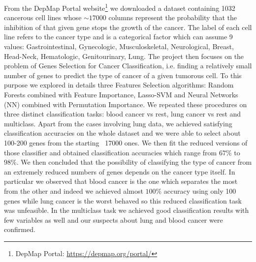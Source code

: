 \documentclass[a4paper,11pt, oneside]{article}  %
\begin{document}
From the DepMap Portal website\footnote{DepMap Portal: \url{https://depmap.org/portal/}} we downloaded a dataset containing 1032 cancerous cell lines whose $\sim 17000$ columns represent the probability that the inhibition of that given gene stops the growth of the cancer.  The label of each cell line refers to the cancer type and is a categorical factor which can assume 9 values: Gastrointestinal,  Gynecologic,  Musculoskeletal,  Neurological,  Breast,  Head-Neck,  Hematologic,  Genitourinary,  Lung.  The project then focuses on the problem of Genes Selection for Cancer Classification,  i.e.  finding a relatively small number of genes to predict the type of cancer of a given tumorous cell.  To this purpose we explored in details three Features Selection algorithms: Random Forests combined with Feature Importance,  Lasso-SVM and Neural Networks (NN) combined with Permutation Importance.  We repeated these procedures on three distinct classification tasks: blood cancer vs rest,  lung cancer vs rest and multiclass.  Apart from the cases involving lung data,  we achieved satisfying classification accuracies on the whole dataset and we were able to select about 100-200 genes from the starting ~17000 ones.  We then fit the reduced versions of those classifier and obtained classification accuracies which range from $67\%$ to $98\%$.  We then concluded that the possibility of classifying the type of cancer from an extremely reduced numbers of genes depends on the cancer type itself.  In particular we observed that blood cancer is the one which separates the most from the other and indeed we achieved almost $100\%$ accuracy using only 100 genes while lung cancer is the worst behaved so this reduced classification task was unfeasible.  In the multiclass task we achieved good classification results with few variables as well and our suspects about lung and blood cancer were confirmed.  
\end{document}
